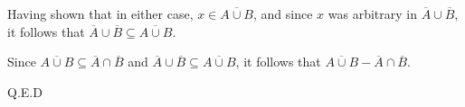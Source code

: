 \documentclass{article}
\begin{document}
\begin{enumerate}
\begin{itemize}
\begin{enumerate}
        \end{enumerate}
        Having shown that in either case, $x\in \overline{A\cup B}$, and since $x$ was arbitrary in $\overline{A} \cup \overline{B}$, it follows that $\overline{A} \cup \overline{B} \subseteq \overline{A\cup B}. $
        
    \end{itemize}
    Since $ \overline{A\cup B} \subseteq \overline{A}\cap \overline{B}$ and $\overline{A} \cup \overline{B} \subseteq \overline{A\cup B}$, it follows that $\overline{A\cup B} - \overline{A}\cap \overline{B}$. 
\end{enumerate}
Q.E.D
\end{document}
